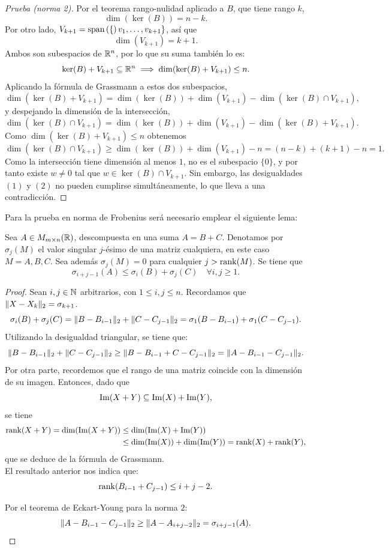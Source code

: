 \begin{proof}[Prueba (norma 2)]
	Por el teorema rango-nulidad aplicado a $B$, que tiene rango $k$,
	\[
		\dim(\ker(B)) = n - k.
	\]
	Por otro lado, $V_{k+1} = \operatorname{span}\left(\{\right)v_1, \ldots, v_{k+1}\}$, así que
	\[
		\dim(V_{k+1}) = k + 1.
	\]
	Ambos son subespacios de $\mathbb{R}^n$, por lo que su suma también lo es:
	\[
		\ker(B) + V_{k+1} \subseteq \mathbb{R}^n
		\implies
		\dim(\ker(B) + V_{k+1}) \leq n.
	\]
	Aplicando la fórmula de Grassmann a estos dos subespacios,
	\[
		\dim(\ker(B) + V_{k+1}) = \dim(\ker(B)) + \dim(V_{k+1}) - \dim(\ker(B) \cap V_{k+1}),
	\]
	y despejando la dimensión de la intersección,
	\[
		\dim(\ker(B) \cap V_{k+1})
		= \dim(\ker(B)) + \dim(V_{k+1}) - \dim(\ker(B) + V_{k+1}).
	\]
	Como $\dim(\ker(B) + V_{k+1}) \leq n$ obtenemos
	\[
		\dim(\ker(B) \cap V_{k+1})
		\geq \dim(\ker(B)) + \dim(V_{k+1}) - n
		= (n-k) + (k+1) - n = 1.
	\]
	Como la intersección tiene dimensión al menos $1$, no es el subespacio $\{0\}$, y por tanto existe $w \neq 0$ tal que $w \in \ker(B) \cap V_{k+1}$.
	Sin embargo, las desigualdades $(1)$ y $(2)$ no pueden cumplirse simultáneamente, lo que lleva a una contradicción.
\end{proof}

Para la prueba en norma de Frobenius será necesario emplear el siguiente lema:

\begin{lemma}[Weyl]\label{lem:weyl}
	Sea $A \in M_{m \times n}(\mathbb{R})$, descompuesta en una suma $A = B + C$. Denotamos por $\sigma_j(M)$ el valor singular $j$-ésimo de una matriz cualquiera, en este caso $M = A, B, C$. Sea además $\sigma_j(M) = 0$ para cualquier $j > \operatorname{rank}(M)$. Se tiene que
	\[ \sigma_{i+j-1}(A) \leq \sigma_i(B) + \sigma_j(C) \quad \forall i, j \geq 1. \]
\end{lemma}

\begin{proof}
	Sean $i, j \in \mathbb{N}$ arbitrarios, con $1 \leq i, j \leq n$. Recordamos que $\lVert X - X_k\rVert_2 = \sigma_{k+1}$.
	\[ \sigma_i(B) + \sigma_j(C) = \lVert B - B_{i-1}\rVert_2 + \lVert C - C_{j-1}\rVert_2 = \sigma_1(B - B_{i-1}) + \sigma_1(C - C_{j-1}). \]
	Utilizando la desigualdad triangular, se tiene que:
	\[ \lVert B - B_{i-1}\rVert_2 + \lVert C - C_{j-1}\rVert_2 \geq \lVert B - B_{i-1} + C - C_{j-1}\rVert_2 = \lVert A - B_{i-1} - C_{j-1}\rVert_2. \]
	Por otra parte, recordemos que el rango de una matriz coincide con la dimensión de su imagen. Entonces, dado que
	\[
		\operatorname{Im}(X + Y) \subseteq \operatorname{Im}(X) + \operatorname{Im}(Y),
	\]
	se tiene
	\begin{align*}
		\operatorname{rank}(X + Y) = \dim(\operatorname{Im}(X+Y))
		 & \leq \dim(\operatorname{Im}(X) + \operatorname{Im}(Y))                          \\
		 & \leq \dim(\operatorname{Im}(X)) + \dim(\operatorname{Im}(Y)) = \operatorname{rank}(X) + \operatorname{rank}(Y),
	\end{align*}
	que se deduce de la fórmula de Grassmann. \\

	El resultado anterior nos indica que:
	\[ \rk\parens*{B_{i-1} + C_{j-1}} \leq i + j - 2. \]

	Por el teorema de Eckart-Young para la norma $2$:
	\[ \lVert A - B_{i-1} - C_{j-1}\rVert_2 \geq \lVert A - A_{i+j-2}\rVert_2 = \sigma_{i+j-1}(A). \]
\end{proof}

